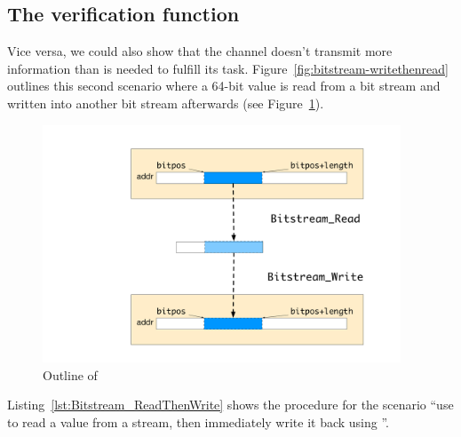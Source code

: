 \subsection{The verification function }

Vice versa, we could also show that the channel doesn't transmit more
information than is needed to fulfill its task.
Figure~\ref{fig:bitstream-writethenread} outlines this second scenario
where a 64-bit value is read from a bit stream and written into another bit stream
afterwards (see Figure~\ref{fig:bitstream-readthenwrite}).

\begin{figure}[hbt]
\begin{center}
\includegraphics[width=0.95\textwidth]{figures/bitstream-readthenwrite.pdf}
\caption{\label{fig:bitstream-readthenwrite}
        Outline of }
\end{center}
\end{figure}

\FloatBarrier

%
Listing~\ref{lst:Bitstream_ReadThenWrite}
shows the procedure for the scenario ``use 
to read a value from a stream, then immediately write it back using
''.




